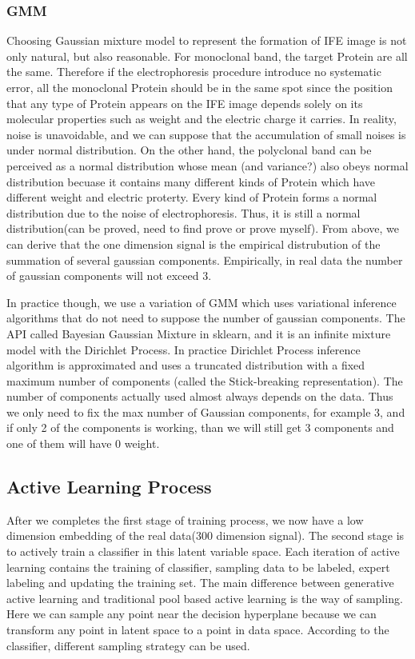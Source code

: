 \documentclass[10pt,twocolumn,letterpaper]{article}
\begin{document}
\subsubsection{GMM}
Choosing Gaussian mixture model to represent the formation of IFE image is not only natural, but also reasonable. For monoclonal band, the target Protein are all the same. Therefore if the electrophoresis procedure introduce no systematic error, all the monoclonal Protein should be in the same spot since the position that any type of Protein appears on the IFE image depends solely on its molecular properties such as weight and the electric charge it carries. In reality, noise is unavoidable, and we can suppose that the accumulation of small noises is under normal distribution. On the other hand, the polyclonal band can be perceived as a normal distribution whose mean (and variance?) also obeys normal distribution becuase it contains many different kinds of Protein which have different weight and electric proterty. Every kind of Protein forms a normal distribution due to the noise of electrophoresis. Thus, it is still a normal distribution(can be proved, need to find prove or prove myself). From above, we can derive that the one dimension signal is the empirical distrubution of the summation of several gaussian components. Empirically, in real data the number of gaussian components will not exceed 3.

In practice though, we use a variation of GMM which uses variational inference algorithms that do not need to suppose the number of gaussian components. The API called Bayesian Gaussian Mixture in sklearn\cite{scikit-learn}, and it is an infinite mixture model with the Dirichlet Process. In practice Dirichlet Process inference algorithm is approximated and uses a truncated distribution with a fixed maximum number of components (called the Stick-breaking representation). The number of components actually used almost always depends on the data\cite{article}\cite{ATTIAS2000A}. Thus we only need to fix the max number of Gaussian components, for example 3, and if only 2 of the components is working, than we will still get 3 components and one of them will have 0 weight.


\subsection{Active Learning Process}
After we completes the first stage of training process, we now have a low dimension embedding of the real data(300 dimension signal). The second stage is to actively train a classifier in this latent variable space. Each iteration of active learning contains the training of classifier, sampling data to be labeled, expert labeling and updating the training set. The main difference between generative active learning and traditional pool based active learning is the way of sampling. Here we can sample any point near the decision hyperplane because we can transform any point in latent space to a point in data space. According to the classifier, different sampling strategy can be used.
\end{document}

